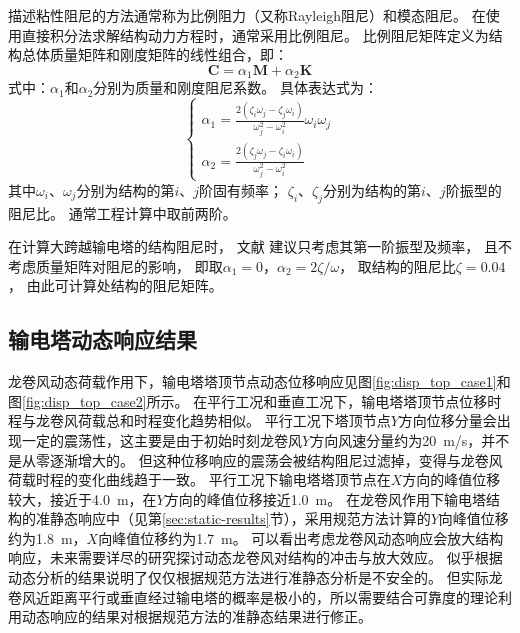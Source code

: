 描述粘性阻尼的方法通常称为比例阻力（又称Rayleigh阻尼）和模态阻尼。
在使用直接积分法求解结构动力方程时，通常采用比例阻尼。
比例阻尼矩阵定义为结构总体质量矩阵和刚度矩阵的线性组合，即：
\begin{equation}
  \bm{C} = \alpha_1 \bm{M} + \alpha_2 \bm{K}
\end{equation}
式中：$\alpha_1$和$\alpha_2$分别为质量和刚度阻尼系数。
具体表达式为：
\begin{equation}
    \begin{cases}
        \alpha_1 = \frac{2\left(\zeta_i\omega_j-\zeta_j \omega_i\right)}{\omega_j^2-\omega_i^2} \omega_i \omega_j \\
        \alpha_2 = \frac{2\left(\zeta_j \omega_j-\zeta_i \omega_i\right)}{\omega_j^2-\omega_i^2} 
    \end{cases}
\end{equation}
其中$\omega_i$、$\omega_j$分别为结构的第$i$、$j$阶固有频率；
$\zeta_i$、$\zeta_j$分别为结构的第$i$、$j$阶振型的阻尼比。
通常工程计算中取前两阶。

在计算大跨越输电塔的结构阻尼时，
文献\cite{wong2009guidelines}\cite{loredo2003influence}\cite{madugula2001dynamic}\cite{ostendorp1997damping}
建议只考虑其第一阶振型及频率，
且不考虑质量矩阵对阻尼的影响，
即取$\alpha_1=0$，$\alpha_2=2\zeta/\omega$，
取结构的阻尼比$\zeta=0.04$\cite{loredo2003influence}，
由此可计算处结构的阻尼矩阵。

\subsection{输电塔动态响应结果}
龙卷风动态荷载作用下，输电塔塔顶节点动态位移响应见图\ref{fig:disp_top_case1}和图\ref{fig:disp_top_case2}所示。
在平行工况和垂直工况下，输电塔塔顶节点位移时程与龙卷风荷载总和时程变化趋势相似。
平行工况下塔顶节点$Y$方向位移分量会出现一定的震荡性，这主要是由于初始时刻龙卷风$Y$方向风速分量约为\SI{20}{m/s}，并不是从零逐渐增大的。
但这种位移响应的震荡会被结构阻尼过滤掉，变得与龙卷风荷载时程的变化曲线趋于一致。
平行工况下输电塔塔顶节点在$X$方向的峰值位移较大，接近于\SI{4.0}{m}，在$Y$方向的峰值位移接近\SI{1.0}{m}。
在龙卷风作用下输电塔结构的准静态响应中（见第\ref{sec:static-results}节），采用规范方法计算的$Y$向峰值位移约为\SI{1.8}{m}，$X$向峰值位移约为\SI{1.7}{m}。
可以看出考虑龙卷风动态响应会放大结构响应，未来需要详尽的研究探讨动态龙卷风对结构的冲击与放大效应。
似乎根据动态分析的结果说明了仅仅根据规范方法进行准静态分析是不安全的。
但实际龙卷风近距离平行或垂直经过输电塔的概率是极小的，所以需要结合可靠度的理论利用动态响应的结果对根据规范方法的准静态结果进行修正。

